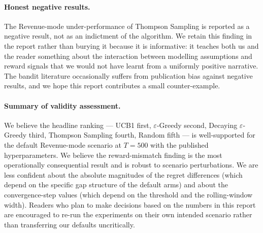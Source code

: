 \paragraph{Honest negative results.}
The Revenue-mode under-performance of Thompson Sampling is reported as a negative result, not as an indictment of the algorithm. We retain this finding in the report rather than burying it because it is informative: it teaches both us and the reader something about the interaction between modelling assumptions and reward signals that we would not have learnt from a uniformly positive narrative. The bandit literature occasionally suffers from publication bias against negative results, and we hope this report contributes a small counter-example.

\paragraph{Summary of validity assessment.}
We believe the headline ranking --- UCB1 first, $\varepsilon$-Greedy second, Decaying $\varepsilon$-Greedy third, Thompson Sampling fourth, Random fifth --- is well-supported for the default Revenue-mode scenario at $T = 500$ with the published hyperparameters. We believe the reward-mismatch finding is the most operationally consequential result and is robust to scenario perturbations. We are less confident about the absolute magnitudes of the regret differences (which depend on the specific gap structure of the default arms) and about the convergence-step values (which depend on the threshold and the rolling-window width). Readers who plan to make decisions based on the numbers in this report are encouraged to re-run the experiments on their own intended scenario rather than transferring our defaults uncritically.

\newpage
